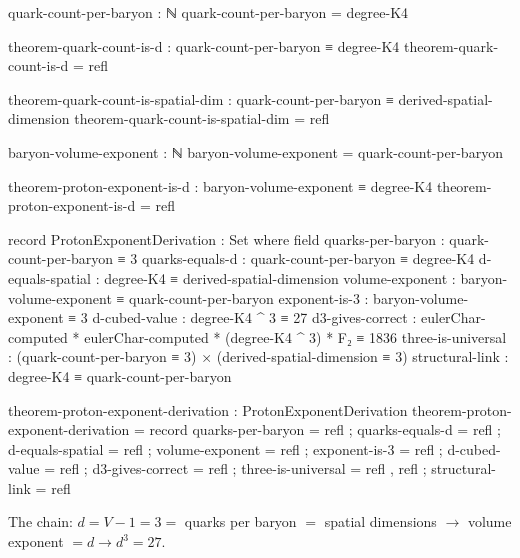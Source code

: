 \documentclass[11pt,a4paper]{book}
\begin{document}
\begin{code}
quark-count-per-baryon : ℕ
quark-count-per-baryon = degree-K4

theorem-quark-count-is-d : quark-count-per-baryon ≡ degree-K4
theorem-quark-count-is-d = refl

theorem-quark-count-is-spatial-dim : quark-count-per-baryon ≡ derived-spatial-dimension
theorem-quark-count-is-spatial-dim = refl

baryon-volume-exponent : ℕ
baryon-volume-exponent = quark-count-per-baryon

theorem-proton-exponent-is-d : baryon-volume-exponent ≡ degree-K4
theorem-proton-exponent-is-d = refl

record ProtonExponentDerivation : Set where
  field
    quarks-per-baryon : quark-count-per-baryon ≡ 3
    quarks-equals-d   : quark-count-per-baryon ≡ degree-K4
    d-equals-spatial  : degree-K4 ≡ derived-spatial-dimension
    volume-exponent   : baryon-volume-exponent ≡ quark-count-per-baryon
    exponent-is-3     : baryon-volume-exponent ≡ 3
    d-cubed-value     : degree-K4 ^ 3 ≡ 27
    d3-gives-correct  : eulerChar-computed * eulerChar-computed * (degree-K4 ^ 3) * F₂ ≡ 1836
    three-is-universal : (quark-count-per-baryon ≡ 3) × 
                         (derived-spatial-dimension ≡ 3)
    structural-link   : degree-K4 ≡ quark-count-per-baryon

theorem-proton-exponent-derivation : ProtonExponentDerivation
theorem-proton-exponent-derivation = record
  { quarks-per-baryon = refl
  ; quarks-equals-d   = refl
  ; d-equals-spatial  = refl
  ; volume-exponent   = refl
  ; exponent-is-3     = refl
  ; d-cubed-value     = refl
  ; d3-gives-correct  = refl
  ; three-is-universal = refl , refl
  ; structural-link   = refl
  }
\end{code}

The chain: $d = V - 1 = 3 = $ quarks per baryon $= $ spatial dimensions $\to$ 
volume exponent $= d \to d^3 = 27$.
\end{document}
